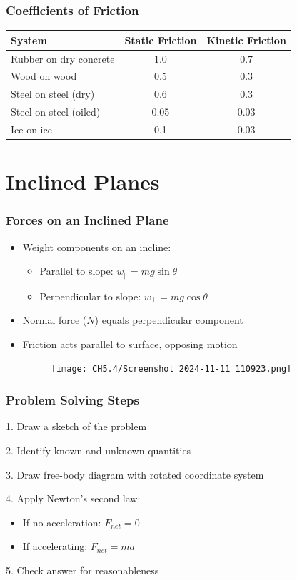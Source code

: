 \documentclass{beamer}
\begin{document}
\begin{frame}
\frametitle{Coefficients of Friction}
\begin{table}
\begin{tabular}{|l|c|c|}
\hline
System & Static Friction & Kinetic Friction \\
\hline
Rubber on dry concrete & 1.0 & 0.7 \\
Wood on wood & 0.5 & 0.3 \\
Steel on steel (dry) & 0.6 & 0.3 \\
Steel on steel (oiled) & 0.05 & 0.03 \\
Ice on ice & 0.1 & 0.03 \\
\hline
\end{tabular}
\end{table}
\end{frame}

\section{Inclined Planes}

\begin{frame}
\frametitle{Forces on an Inclined Plane}
\begin{itemize}
    \item Weight components on an incline:
    \begin{itemize}
        \item Parallel to slope: $w_\parallel = mg\sin\theta$
        \item Perpendicular to slope: $w_\perp = mg\cos\theta$
    \end{itemize}
    \item Normal force ($N$) equals perpendicular component
    \item Friction acts parallel to surface, opposing motion
\begin{figure}[H]
    \centering
    \texttt{[image: CH5.4/Screenshot 2024-11-11 110923.png]}
\end{figure}
\end{itemize}
\end{frame}

\begin{frame}
\frametitle{Problem Solving Steps}
1. Draw a sketch of the problem
\vspace{0.5em}

2. Identify known and unknown quantities
\vspace{0.5em}

3. Draw free-body diagram with rotated coordinate system
\vspace{0.5em}

4. Apply Newton's second law:
\begin{itemize}
    \item If no acceleration: $F_{net} = 0$
    \item If accelerating: $F_{net} = ma$
\end{itemize}
\vspace{0.5em}

5. Check answer for reasonableness
\end{frame}
\end{document}

